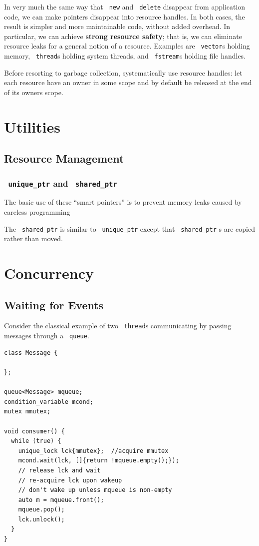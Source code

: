 \documentclass[11pt]{article}
\let\OldTexttt\texttt
\renewcommand{\texttt}[1]{\OldTexttt{\color{MidnightBlue} #1}}
\begin{document}
In very much the same way that \texttt{new} and \texttt{delete} disappear from application code, we can make
pointers disappear into resource handles. In both cases, the result is simpler and more
maintainable code, without added overhead. In particular, we can achieve \textbf{strong resource safety};
that is, we can eliminate resource leaks for a general notion of a resource. Examples are
\texttt{vector}s holding memory, \texttt{thread}s holding system threads, and \texttt{fstream}s
holding file handles.

Before resorting to garbage collection, systematically use resource handles: let each resource
have an owner in some scope and by default be released at the end of its owners scope.

\section{Utilities}
\label{sec:orgef9d2cc}
\subsection{Resource Management}
\label{sec:org26647dc}
\subsubsection{\texttt{unique\_ptr} and \texttt{shared\_ptr}}
\label{sec:org33dd8b7}
The basic use of these ``smart pointers''  is to prevent memory leaks caused by careless
programming

The \texttt{shared\_ptr} is similar to \texttt{unique\_ptr} except that \texttt{shared\_ptr} s are copied rather than moved.
\section{Concurrency}
\label{sec:orgf7fa3a6}
\subsection{Waiting for Events}
\label{sec:orgd3e0205}
Consider the classical example of two \texttt{thread}​s communicating by passing messages through a \texttt{queue}.
\begin{verbatim}
class Message {

};

queue<Message> mqueue;
condition_variable mcond;
mutex mmutex;

void consumer() {
  while (true) {
    unique_lock lck{mmutex};  //acquire mmutex
    mcond.wait(lck, []{return !mqueue.empty();});
    // release lck and wait
    // re-acquire lck upon wakeup
    // don't wake up unless mqueue is non-empty
    auto m = mqueue.front();
    mqueue.pop();
    lck.unlock();
  }
}
\end{verbatim}
\end{document}

